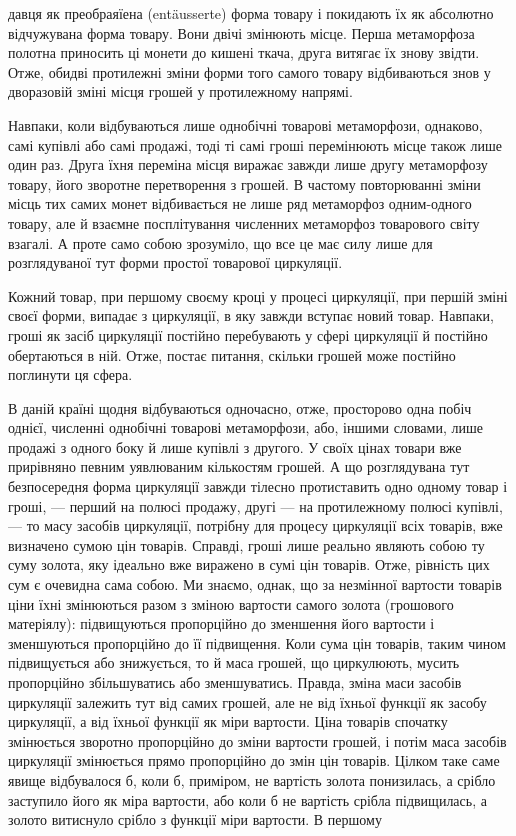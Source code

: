 давця як преобраяїена (entäusserte) форма товару і покидають їх
як абсолютно відчужувана форма товару. Вони двічі змінюють
місце. Перша метаморфоза полотна приносить ці монети до кишені
ткача, друга витягає їх знову звідти. Отже, обидві протилежні
зміни форми того самого товару відбиваються знов у дворазовій
зміні місця грошей у протилежному напрямі.

Навпаки, коли відбуваються лише однобічні товарові метаморфози,
однаково, самі купівлі або самі продажі, тоді ті самі
гроші перемінюють місце також лише один раз. Друга їхня
переміна місця виражає завжди лише другу метаморфозу товару,
його зворотне перетворення з грошей. В частому повторюванні
зміни місць тих самих монет відбивається не лише ряд метаморфоз
одним-одного товару, але й взаємне посплітування численних
метаморфоз товарового світу взагалі. А проте само собою зрозуміло,
що все це має силу лише для розглядуваної тут форми
простої товарової циркуляції.

Кожний товар, при першому своєму кроці у процесі циркуляції,
при першій зміні своєї форми, випадає з циркуляції, в яку завжди
вступає новий товар. Навпаки, гроші як засіб циркуляції постійно
перебувають у сфері циркуляції й постійно обертаються
в ній. Отже, постає питання, скільки грошей може постійно поглинути
ця сфера.

В даній країні щодня відбуваються одночасно, отже, просторово
одна побіч однієї, численні однобічні товарові метаморфози,
або, іншими словами, лише продажі з одного боку й лише купівлі
з другого. У своїх цінах товари вже прирівняно певним уявлюваним
кількостям грошей. А що розглядувана тут безпосередня
форма циркуляції завжди тілесно протиставить одно одному
товар і гроші, — перший на полюсі продажу, другі — на протилежному
полюсі купівлі, — то масу засобів циркуляції, потрібну
для процесу циркуляції всіх товарів, вже визначено сумою цін
товарів. Справді, гроші лише реально являють собою ту суму
золота, яку ідеально вже виражено в сумі цін товарів. Отже,
рівність цих сум є очевидна сама собою. Ми знаємо, однак, що
за незмінної вартости товарів ціни їхні змінюються разом з
зміною вартости самого золота (грошового матеріялу): підвищуються
пропорційно до зменшення його вартости і зменшуються
пропорційно до її підвищення. Коли сума цін товарів,
таким чином підвищується або знижується, то й маса грошей,
що циркулюють, мусить пропорційно збільшуватись або зменшуватись.
Правда, зміна маси засобів циркуляції залежить тут від
самих грошей, але не від їхньої функції як засобу циркуляції,
а від їхньої функції як міри вартости. Ціна товарів спочатку
змінюється зворотно пропорційно до зміни вартости грошей,
і потім маса засобів циркуляції змінюється прямо пропорційно
до змін цін товарів. Цілком таке саме явище відбувалося б, коли б,
приміром, не вартість золота понизилась, а срібло заступило
його як міра вартости, або коли б не вартість срібла підвищилась,
а золото витиснуло срібло з функції міри вартости. В першому
